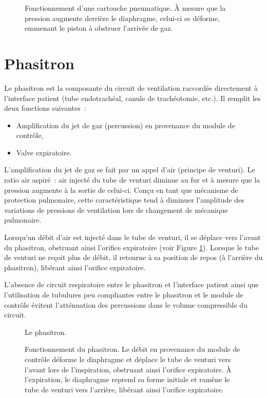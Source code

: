 \begin{figure}[h]
	
	\caption{Fonctionnement d'une cartouche pneumatique. À mesure que la pression
	augmente derrière le diaphragme, celui-ci se déforme, emmenant  le piston à
	obstruer l'arrivée de gaz.} 
\end{figure}

\section{Phasitron}

Le phasitron est la composante du circuit de ventilation raccordée directement à
l'interface patient (tube endotrachéal, canule de trachéotomie, etc.). Il
remplit les deux fonctions suivantes : 

\begin{itemize} 
	\item Amplification du jet de gaz (percussion) en provenance du module de contrôle,
	\item Valve expiratoire.
\end{itemize}

L'amplification du jet de gaz se fait par un appel d'air (principe de venturi).
Le ratio air aspiré : air injecté du tube de venturi diminue au fur et à mesure
que la pression augmente à la sortie de celui-ci. Conçu en tant que mécanisme de
protection pulmonaire, cette caractéristique tend à diminuer l'amplitude des
variations de pressions de ventilation lors de changement de mécanique
pulmonaire.

Lorsqu'un débit d'air est injecté dans le tube de venturi, il se déplace vers
l'avant du phasitron, obstruant ainsi l'orifice expiratoire (voir
Figure \ref{fig:phasitron-coupe}). Lorsque le tube de venturi ne reçoit plus de
débit, il retourne à sa position de repos (à l'arrière du phasitron), libérant
ainsi l'orifice expiratoire.

L'absence de circuit respiratoire entre le phasitron et l'interface patient
ainsi que l'utilisation de tubulures peu compliantes entre le phasitron et le
module de contrôle évitent l'atténuation des percussions dans le volume
compressible du circuit.

\begin{figure}
	
	\caption{Le phasitron.}
\end{figure}

\begin{figure}
	
	\caption{Fonctionnement du phasitron. Le débit en provenance du module de
contrôle déforme le diaphragme et déplace le tube de venturi vers l'avant lors
de l'inspiration, obstruant ainsi l’orifice expiratoire. À l'expiration, le
diaphragme reprend sa forme initiale et ramène le tube de venturi vers
l'arrière, libérant ainsi l'orifice expiratoire.} 
	\label{fig:phasitron-coupe}
\end{figure}

